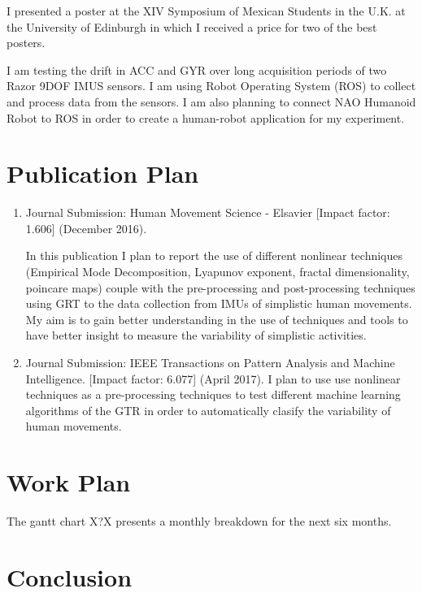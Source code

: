 \documentclass[10pt,journal,onecolumn,compsoc]{IEEEtran}
\begin{document}
I presented a poster at the XIV Symposium of Mexican Students in the U.K. at the University of Edinburgh
in which I received a price for two of the best posters.

I am testing the drift in ACC and GYR over long acquisition periods of two Razor 9DOF IMUS sensors. 
I am using Robot Operating System (ROS) to collect and process data from the sensors.
I am also planning to connect NAO Humanoid Robot to ROS in order to create
a human-robot application for my experiment.




\section{Publication Plan}

\begin{enumerate}
 \item Journal Submission: Human Movement Science - Elsavier [Impact factor: 1.606] (December 2016).
 
In this publication I plan to report the use of different nonlinear techniques 
(Empirical Mode Decomposition, Lyapunov exponent, fractal dimensionality, poincare maps)
couple with the pre-processing and post-processing techniques using GRT 
to the data collection from IMUs of simplistic human movements.
My aim is to gain better understanding 
in the use of techniques and tools to have better insight to measure the variability 
of simplistic activities.

\item Journal Submission: IEEE Transactions on Pattern Analysis and Machine Intelligence.
[Impact factor: 6.077] (April 2017).
I plan to use use nonlinear techniques as a pre-processing techniques 
to test different machine learning algorithms of the GTR in order 
to automatically clasify the variability of human movements. 


\end{enumerate}




\section{Work Plan} 
The gantt chart X?X presents a monthly breakdown for the next six months.

\section{Conclusion}
\end{document}
